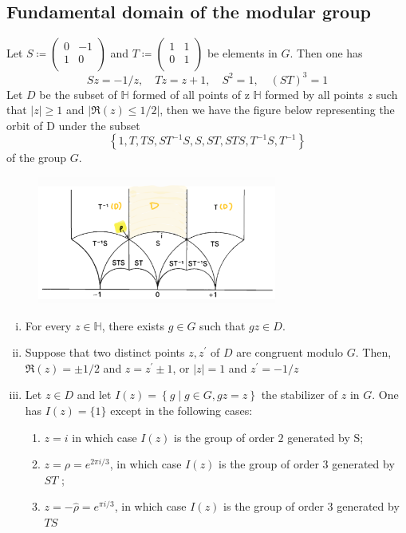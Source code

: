 \documentclass[12pt]{article}
\theoremstyle{definition}
\begin{document}
    \subsection{Fundamental domain of the modular group}
    Let \(S\coloneqq \begin{pmatrix}
        0 &  -1 \\
        1 & 0 \\
    \end{pmatrix} \) and \(T\coloneqq \begin{pmatrix}
        1 &  1 \\
        0 &  1 \\
    \end{pmatrix}\) be elements in \(G\). Then one has
    \[
        Sz = -1/z,\quad Tz=z+1,\quad S^2 =1,\quad (ST)^3=1
    \] 
    Let \(D\) be the subset of \(\mathbb{H} \) formed of all points of z \(\mathbb{H} \) formed by all points \(z\) such that \(\vert z \vert \geq 1 \)  and \(\vert \Re(z) \leq 1/2 \vert \), then we have the figure below representing the orbit of D under the subset \[\left\{1,T,TS,ST^{-1}S, S, ST, STS, T^{-1}S, T^{-1}  \right\}\] of the group \(G\).
    \begin{figure}[H]
        \centering
        \includegraphics[width=0.7\textwidth]{Fig3.png}
        \caption{}
    \end{figure}
    \begin{thm}[label=thm2]
    \begin{enumerate}[(i)]
        \item For every \(z\in \mathbb{H} \), there exists \(g \in G\) such that \(gz\in D\).
        \item Suppose that two distinct points \(z,z^{\prime} \)  of \(D\) are congruent modulo \(G\). Then, \(\Re(z) = \pm 1/2\) and \(z=z^{\prime} \pm 1\), or \(\vert z \vert =1\) and \(z^{\prime} =-1/z\) 
        \item Let \(z\in D\) and let \(I(z)=\left\{g \mid g\in G, gz=z \right\}\) the stabilizer of \(z\) in \(G\). One has \(I(z)=\{1\}\) except in the following cases:
        \begin{enumerate}[label=(\alph*)]
            \item \(z=i\) in which case \(I(z)\) is the group of order \(2\) generated by S;
            \item \(z=\rho = e^{2\pi i/3}\), in which case \(I(z)\) is the group of order \(3\) generated by \(ST\) ;
            \item \(z=-\hat{\rho} = e^{\pi i/3}\), in which case \(I(z)\) is the group of order \(3\) generated by \(TS\)
        \end{enumerate}
    \end{enumerate}
    \end{thm}
    
\end{document}
